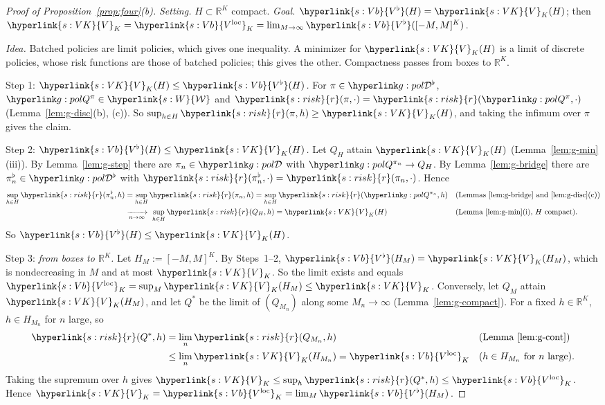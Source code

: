 \documentclass[11pt]{article}
\DeclareRobustCommand{\sy}[2]{{\hyperlink{#1}{#2}}}
\newcommand{\R}{\mathbb{R}}
\newcommand{\1}{\mathbf{1}}
\newcommand{\Wc}{\sy{s:W}{\mathcal W}}
\newcommand{\rk}{\sy{s:risk}{r}}
\newcommand{\VK}{\sy{s:VK}{V}}
\newcommand{\Vb}{\sy{s:Vb}{V^\flat}}
\newcommand{\Vloc}{\sy{s:Vb}{V^{\mathrm{loc}}}}
\begin{document}
\begin{proof}[Proof of Proposition~\ref{prop:four}(b)]
\textit{Setting.} $H\subset\R^K$ compact. \textit{Goal.} $\Vb(H)=\VK_K(H)$; then $\VK_K=\Vloc_K=\lim_{M\to\infty}\Vb([-M,M]^K)$.

\textit{Idea.} Batched policies are limit policies, which gives one inequality. A minimizer for $\VK_K(H)$ is a limit of discrete policies, whose risk functions are
those of batched policies; this gives the other. Compactness passes from boxes to $\R^K$.

Step 1: \emph{$\VK_K(H)\le\Vb(H)$.} For $\pi\in\gBc$, $\gQp\pi\in\Wc$ and $\rk(\pi,\cdot)=\rk(\gQp\pi,\cdot)$ (Lemma~\ref{lem:g-disc}(b), (c)). So
$\sup_{h\in H}\rk(\pi,h)\ge\VK_K(H)$, and taking the infimum over $\pi$ gives the claim.

Step 2: \emph{$\Vb(H)\le\VK_K(H)$.} Let $Q_H$ attain $\VK_K(H)$ (Lemma~\ref{lem:g-min}(iii)). By Lemma~\ref{lem:g-step} there are $\pi_n\in\gDc$ with $\gQp{\pi_n}\to Q_H$. By
Lemma~\ref{lem:g-bridge} there are $\pi^\flat_n\in\gBc$ with $\rk(\pi^\flat_n,\cdot)=\rk(\pi_n,\cdot)$. Hence
\begin{align*}
\sup_{h\in H}\rk(\pi^\flat_n,h)&=\sup_{h\in H}\rk(\pi_n,h)=\sup_{h\in H}\rk(\gQp{\pi_n},h) &&\text{(Lemmas~\ref{lem:g-bridge} and~\ref{lem:g-disc}(c))}\\
&\xrightarrow[n\to\infty]{}\ \sup_{h\in H}\rk(Q_H,h)=\VK_K(H) &&\text{(Lemma~\ref{lem:g-min}(i), }H\text{ compact)}.
\end{align*}
So $\Vb(H)\le\VK_K(H)$.

Step 3: \emph{from boxes to $\R^K$.} Let $H_M:=[-M,M]^K$. By Steps~1--2, $\Vb(H_M)=\VK_K(H_M)$, which is nondecreasing in $M$ and at most $\VK_K$. So the limit exists and
equals $\Vloc_K=\sup_M\VK_K(H_M)\le\VK_K$. Conversely, let $Q_M$ attain $\VK_K(H_M)$, and let $Q^\ast$ be the limit of $(Q_{M_n})$ along some $M_n\to\infty$
(Lemma~\ref{lem:g-compact}). For a fixed $h\in\R^K$, $h\in H_{M_n}$ for $n$ large, so
\begin{align*}
\rk(Q^\ast,h)&=\lim_n\rk(Q_{M_n},h) &&\text{(Lemma~\ref{lem:g-cont})}\\
&\le\lim_n\VK_K(H_{M_n})=\Vloc_K &&\text{(}h\in H_{M_n}\text{ for }n\text{ large)}.
\end{align*}
Taking the supremum over $h$ gives $\VK_K\le\sup_h\rk(Q^\ast,h)\le\Vloc_K$. Hence $\VK_K=\Vloc_K=\lim_M\Vb(H_M)$.
\end{proof}
\end{document}
